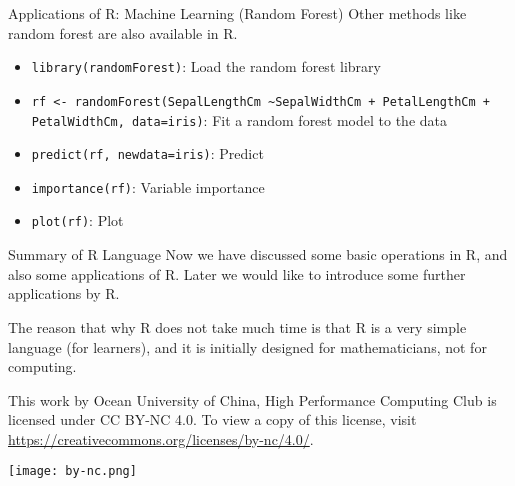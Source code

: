 \documentclass[aspectratio=169]{beamer}
\begin{document}
    \begin{frame}{Applications of R: Machine Learning (Random Forest)}
        Other methods like random forest are also available in R.\par
        \begin{itemize}
            \item \texttt{library(randomForest)}: Load the random forest library
            \item \texttt{rf <- randomForest(SepalLengthCm \textasciitilde SepalWidthCm + PetalLengthCm + PetalWidthCm, data=iris)}: Fit a random forest model to the data
            \item \texttt{predict(rf, newdata=iris)}: Predict
            \item \texttt{importance(rf)}: Variable importance
            \item \texttt{plot(rf)}: Plot 
        \end{itemize}
    \end{frame}

    \begin{frame}{Summary of R Language}
        Now we have discussed some basic operations in R, and also some applications of R. Later we would like to introduce some further applications by R.\par
        The reason that why R does not take much time is that R is a very simple language (for learners), and it is initially designed for mathematicians, not for computing.\par
    \end{frame}
    
    \begin{frame}
        \begin{center}
            This work by Ocean University of China, High Performance Computing Club is licensed under CC BY-NC 4.0. To view a copy of this license, visit \url{https://creativecommons.org/licenses/by-nc/4.0/}.\par
            \texttt{[image: by-nc.png]}
        \end{center}
    \end{frame}
\end{document}
